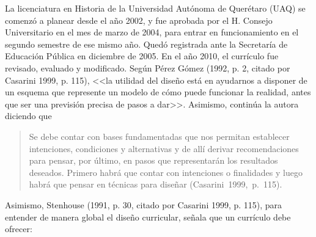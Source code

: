 La licenciatura en Historia de la Universidad Autónoma de Querétaro 
(UAQ) se comenzó a planear desde el año 2002, y fue aprobada por el H\@. 
Consejo Universitario en el mes de marzo de 2004, para entrar en 
funcionamiento en el segundo semestre de ese mismo año. Quedó 
registrada ante la Secretaría de Educación Pública en diciembre de 
2005. En el año 2010, el currículo fue revisado, evaluado y modificado. 
Según Pérez Gómez (1992, p. 2, citado por Casarini 1999, p. 115), 
<<la utilidad del diseño está en ayudarnos a disponer de un esquema 
que represente un modelo de cómo puede funcionar la realidad, antes 
que ser una previsión precisa de pasos a dar>>.  Asimismo, continúa 
la autora diciendo que
\begin{quotation} 
\begin{sloppypar}
Se debe contar con bases fundamentadas que nos permitan 
establecer intenciones, condiciones y alternativas y de allí derivar 
recomendaciones para pensar, por último, en pasos que representarán los 
resultados deseados. Primero habrá que contar con intenciones o 
finalidades y luego habrá que pensar en técnicas para diseñar 
\mbox{(Casarini~1999,~p.~115)}.
\end{sloppypar} 
\end{quotation}

\enlargethispage{2\baselineskip}
Asimismo, Stenhouse (1991, p. 30, citado por Casarini 1999, p. 115), para entender 
de manera global el diseño curricular, señala que un currículo debe ofrecer:

